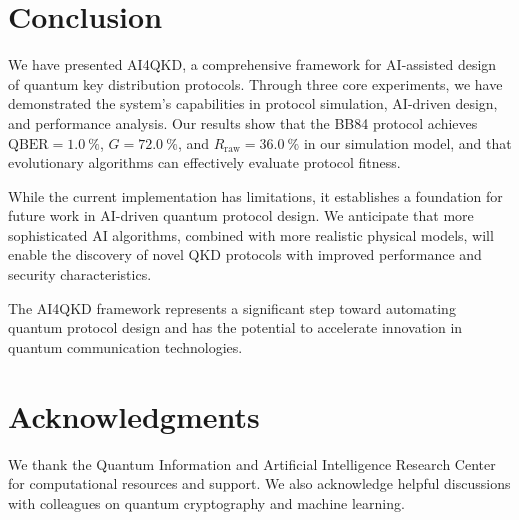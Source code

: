 \documentclass[aps,prl,reprint,superscriptaddress]{revtex4-2}
\newcommand{\qber}{\text{QBER}}
\newcommand{\gain}{G}
\begin{document}
\section{Conclusion}
We have presented AI4QKD, a comprehensive framework for AI-assisted design of quantum key distribution protocols. Through three core experiments, we have demonstrated the system's capabilities in protocol simulation, AI-driven design, and performance analysis. Our results show that the BB84 protocol achieves $\qber = \SI{1.0}{\percent}$, $\gain = \SI{72.0}{\percent}$, and $R_{\text{raw}} = \SI{36.0}{\percent}$ in our simulation model, and that evolutionary algorithms can effectively evaluate protocol fitness.

While the current implementation has limitations, it establishes a foundation for future work in AI-driven quantum protocol design. We anticipate that more sophisticated AI algorithms, combined with more realistic physical models, will enable the discovery of novel QKD protocols with improved performance and security characteristics.

The AI4QKD framework represents a significant step toward automating quantum protocol design and has the potential to accelerate innovation in quantum communication technologies.

\section*{Acknowledgments}
We thank the Quantum Information and Artificial Intelligence Research Center for computational resources and support. We also acknowledge helpful discussions with colleagues on quantum cryptography and machine learning.


\end{document}
